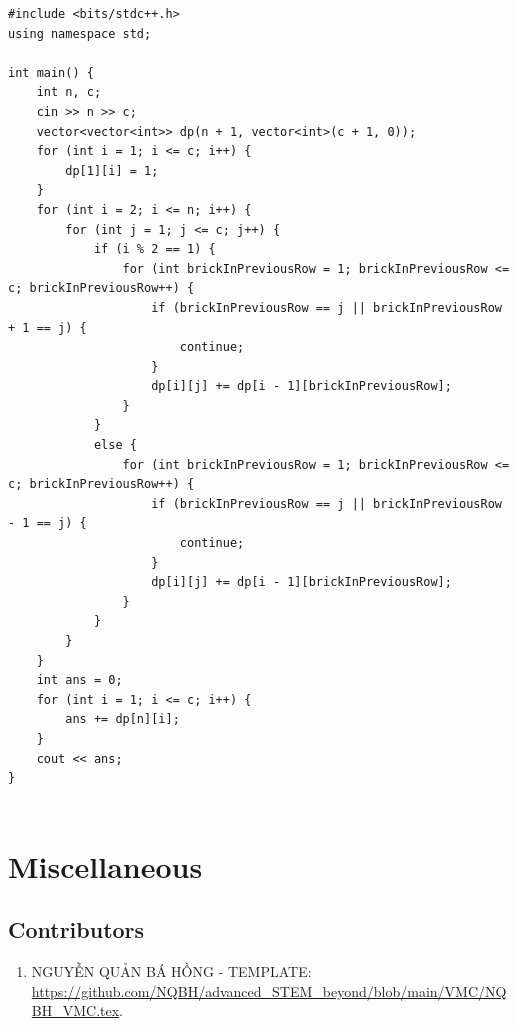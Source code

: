 \documentclass{article}
\begin{document}
\begin{lstlisting}
#include <bits/stdc++.h>
using namespace std;

int main() {
	int n, c;
	cin >> n >> c;
	vector<vector<int>> dp(n + 1, vector<int>(c + 1, 0));
	for (int i = 1; i <= c; i++) {
		dp[1][i] = 1;
	}
	for (int i = 2; i <= n; i++) {
		for (int j = 1; j <= c; j++) {
			if (i % 2 == 1) {
				for (int brickInPreviousRow = 1; brickInPreviousRow <= c; brickInPreviousRow++) {
					if (brickInPreviousRow == j || brickInPreviousRow + 1 == j) {
						continue;
					}
					dp[i][j] += dp[i - 1][brickInPreviousRow];
				}
			}
			else {
				for (int brickInPreviousRow = 1; brickInPreviousRow <= c; brickInPreviousRow++) {
					if (brickInPreviousRow == j || brickInPreviousRow - 1 == j) {
						continue;
					}
					dp[i][j] += dp[i - 1][brickInPreviousRow];
				}
			}
		}
	}
	int ans = 0;
	for (int i = 1; i <= c; i++) {
		ans += dp[n][i];
	}
	cout << ans;
}
	
\end{lstlisting}

\section{Miscellaneous}

\subsection{Contributors}

\begin{enumerate}
	\item {\sc NGUYỄN QUẢN BÁ HỒNG - TEMPLATE}: \url{https://github.com/NQBH/advanced_STEM_beyond/blob/main/VMC/NQBH_VMC.tex}.
\end{enumerate}


\printbibliography[heading=bibintoc]
	
\end{document}
